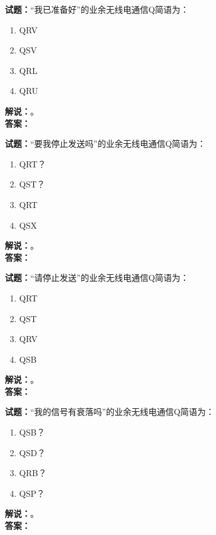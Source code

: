 \documentclass{ctexbook}
\begin{document}
\vspace{\baselineskip}

\noindent\textbf{试题：}“我已准备好”的业余无线电通信Q简语为：
\begin{enumerate}[leftmargin=3em]
  \item QRV
  \item QSV
  \item QRL
  \item QRU
\end{enumerate}
\noindent\textbf{解说：}\textbf{}。\\\noindent\textbf{答案：}

\vspace{\baselineskip}

\noindent\textbf{试题：}“要我停止发送吗”的业余无线电通信Q简语为：
\begin{enumerate}[leftmargin=3em]
  \item QRT？
  \item QST？
  \item QRT
  \item QSX
\end{enumerate}
\noindent\textbf{解说：}\textbf{}。\\\noindent\textbf{答案：}

\vspace{\baselineskip}

\noindent\textbf{试题：}“请停止发送”的业余无线电通信Q简语为：
\begin{enumerate}[leftmargin=3em]
  \item QRT
  \item QST
  \item QRV
  \item QSB
\end{enumerate}
\noindent\textbf{解说：}\textbf{}。\\\noindent\textbf{答案：}

\vspace{\baselineskip}

\noindent\textbf{试题：}“我的信号有衰落吗”的业余无线电通信Q简语为：
\begin{enumerate}[leftmargin=3em]
  \item QSB？
  \item QSD？
  \item QRB？
  \item QSP？
\end{enumerate}
\noindent\textbf{解说：}\textbf{}。\\\noindent\textbf{答案：}
\end{document}
